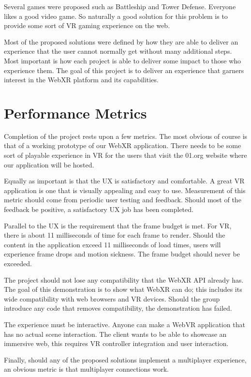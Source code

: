 \documentclass[10pt,letterpaper,draftclsnofoot,onecolumn]{IEEEtran}
\begin{document}
\begin{singlespace}
Several games were proposed such as Battleship and Tower Defense. Everyone likes a good video game. So naturally a good solution for this problem is to provide some sort of VR gaming experience on the web.

Most of the proposed solutions were defined by how they are able to deliver an experience that the user cannot normally get without many additional steps. Most important is how each project is able to deliver some impact to those who experience them. The goal of this project is to deliver an experience that garners interest in the WebXR platform and its capabilities.

\section{Performance Metrics}
Completion of the project rests upon a few metrics. The most obvious of course is that of a working prototype of our WebXR application. There needs to be some sort of playable experience in VR for the users that visit the 01.org website where our application will be hosted. 

Equally as important is that the UX is satisfactory and comfortable. A great VR application is one that is visually appealing and easy to use. Measurement of this metric should come from periodic user testing and feedback. Should most of the feedback be positive, a satisfactory UX job has been completed.

Parallel to the UX is the requirement that the frame budget is met. For VR, there is about 11 milliseconds of time for each frame to render. Should the content in the application exceed 11 milliseconds of load times, users will experience frame drops and motion sickness. The frame budget should never be exceeded.

The project should not lose any compatibility that the WebXR API already has. The goal of this demonstration is to show what WebXR can do; this includes its wide compatibility with web browsers and VR devices. Should the group introduce any code that removes compatibility, the demonstration has failed.

The experience must be interactive. Anyone can make a WebVR application that has no actual scene interaction. The client wants to be able to showcase an immersive web, this requires VR controller integration and user interaction.

Finally, should any of the proposed solutions implement a multiplayer experience, an obvious metric is that multiplayer connections work.


\end{singlespace}
\end{document}
